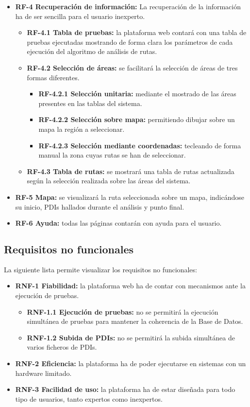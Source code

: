 \begin{itemize}
	\item \textbf{RF-4 Recuperación de información:} La recuperación de la información ha de ser sencilla para el usuario inexperto.
	\begin{itemize}
		\item \textbf{RF-4.1 Tabla de pruebas:} la plataforma web contará con una tabla de pruebas ejecutadas mostrando de forma clara los parámetros de cada ejecución del algoritmo de análisis de rutas.
		\item \textbf{RF-4.2 Selección de áreas:} se facilitará la selección de áreas de tres formas diferentes.
		\begin{itemize}
			\item \textbf{RF-4.2.1 Selección unitaria:} mediante el mostrado de las áreas presentes en las tablas del sistema.
			\item \textbf{RF-4.2.2 Selección sobre mapa:} permitiendo dibujar sobre un mapa la región a seleccionar.
			\item \textbf{RF-4.2.3 Selección mediante coordenadas:} tecleando de forma manual la zona cuyas rutas se han de seleccionar.
		\end{itemize}
		\item \textbf{RF-4.3 Tabla de rutas:} se mostrará una tabla de rutas actualizada según la selección realizada sobre las áreas del sistema.
	\end{itemize}
	\item \textbf{RF-5 Mapa:} se visualizará la ruta seleccionada sobre un mapa, indicándose su inicio, PDIs hallados durante el análisis y punto final.
	\item \textbf{RF-6 Ayuda:} todas las páginas contarán con ayuda para el usuario.
\end{itemize}

\subsection{Requisitos no funcionales}
La siguiente lista permite visualizar los requisitos no funcionales:

\begin{itemize}
	\item \textbf{RNF-1 Fiabilidad:} la plataforma web ha de contar con mecanismos ante la ejecución de pruebas.
	\begin{itemize}
		\item \textbf{RNF-1.1 Ejecución de pruebas:} no se permitirá la ejecución simultánea de pruebas para mantener la coherencia de la Base de Datos.
		\item \textbf{RNF-1.2 Subida de PDIs:} no se permitirá la subida simultánea de varios ficheros de PDIs.
	\end{itemize}
	\item \textbf{RNF-2 Eficiencia:} la plataforma ha de poder ejecutarse en sistemas con un hardware limitado.
	\item \textbf{RNF-3 Facilidad de uso:} la plataforma ha de estar diseñada para todo tipo de usuarios, tanto expertos como inexpertos.
\end{itemize}

